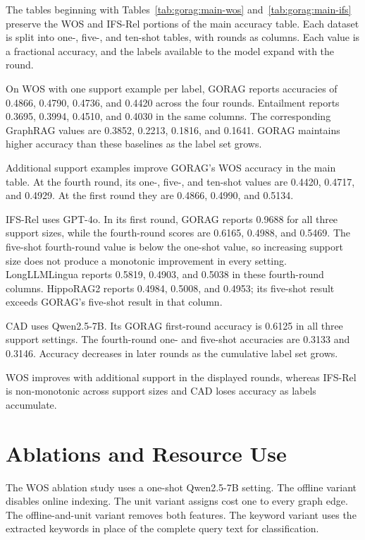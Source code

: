 The tables beginning with Tables~\ref{tab:gorag:main-wos} and~\ref{tab:gorag:main-ifs} preserve the WOS and IFS-Rel portions of the main accuracy table. Each dataset is split into one-, five-, and ten-shot tables, with rounds as columns. Each value is a fractional accuracy, and the labels available to the model expand with the round.



On WOS with one support example per label, GORAG reports accuracies of 0.4866, 0.4790, 0.4736, and 0.4420 across the four rounds. Entailment reports 0.3695, 0.3994, 0.4510, and 0.4030 in the same columns. The corresponding GraphRAG values are 0.3852, 0.2213, 0.1816, and 0.1641. GORAG maintains higher accuracy than these baselines as the label set grows.

Additional support examples improve GORAG's WOS accuracy in the main table. At the fourth round, its one-, five-, and ten-shot values are 0.4420, 0.4717, and 0.4929. At the first round they are 0.4866, 0.4990, and 0.5134.

IFS-Rel uses GPT-4o. In its first round, GORAG reports 0.9688 for all three support sizes, while the fourth-round scores are 0.6165, 0.4988, and 0.5469. The five-shot fourth-round value is below the one-shot value, so increasing support size does not produce a monotonic improvement in every setting. LongLLMLingua reports 0.5819, 0.4903, and 0.5038 in these fourth-round columns. HippoRAG2 reports 0.4984, 0.5008, and 0.4953; its five-shot result exceeds GORAG's five-shot result in that column.

CAD uses Qwen2.5-7B. Its GORAG first-round accuracy is 0.6125 in all three support settings. The fourth-round one- and five-shot accuracies are 0.3133 and 0.3146. Accuracy decreases in later rounds as the cumulative label set grows.

WOS improves with additional support in the displayed rounds, whereas IFS-Rel is non-monotonic across support sizes and CAD loses accuracy as labels accumulate.

\section{Ablations and Resource Use}
\label{sec:gorag:ablations}

The WOS ablation study uses a one-shot Qwen2.5-7B setting. The offline variant disables online indexing. The unit variant assigns cost one to every graph edge. The offline-and-unit variant removes both features. The keyword variant uses the extracted keywords in place of the complete query text for classification.

